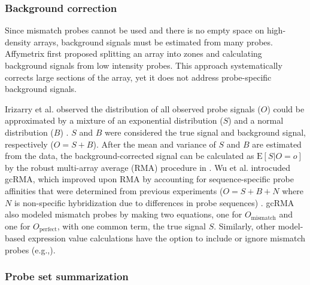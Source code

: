 \subsubsection{Background correction}

Since mismatch probes cannot be used and there is no 
empty space on high-density arrays, 
background signals must be estimated from many
probes. Affymetrix first proposed splitting an array
into zones and calculating background signals from low
intensity probes. This approach systematically corrects large
sections of the array,
yet it does not address probe-specific background signals.

Irizarry et al. observed the distribution
of all observed probe signals ($O$) could be approximated by
a mixture of an exponential distribution ($S$) and a
normal distribution ($B$) \cite{Irizarry:2003ge}.
$S$ and $B$ were considered the true signal and background signal, respectively ($O=S+B$).
After the mean and variance of $S$ and $B$ are estimated from the data, 
the background-corrected signal can be calculated 
as $\text{E}[S|O=o]$ by the robust multi-array average (RMA) procedure in
\cite{Irizarry:2003ge}. 
Wu et al. introcuded gcRMA, which improved upon RMA by 
accounting for sequence-specific probe
affinities that were determined from previous experiments
($O=S+B+N$ where $N$ is non-specific hybridization due to
differences in probe sequences) \cite{Wu:2004wh}. gcRMA
also modeled mismatch probes by making two equations, one for 
$O_{\text{mismatch}}$ and one for $O_{\text{perfect}}$, with one common 
term, the true signal $S$. 
Similarly, other model-based expression value calculations
have the option to include or ignore
mismatch probes (e.g.,\cite{Li:2001jv,Milo:2003tt}).

\subsubsection{Probe set summarization}

